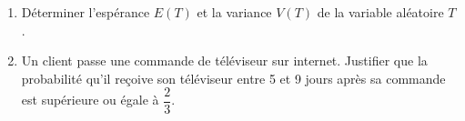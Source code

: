 \documentclass[10pt]{article}
\begin{document}
\begin{enumerate}
	\begin{enumerate}
		\item Déterminer l'espérance $E(T)$ et la variance $V(T)$ de la variable aléatoire $T$.
		\item Un client passe une commande de téléviseur sur internet. Justifier que la probabilité qu'il reçoive son téléviseur entre 5 et 9 jours après sa commande est supérieure ou égale à $\dfrac{2}{3}$.
	\end{enumerate}

\end{enumerate}
\medskip
\end{document}
